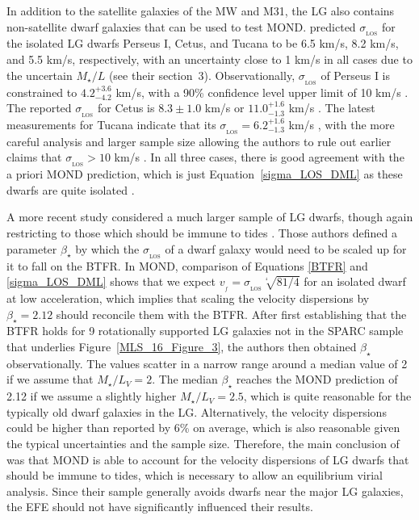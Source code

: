 \documentclass[fleqn,usenatbib,useAMS,onecolumn]{mnras} %
\begin{document}
In addition to the satellite galaxies of the MW and M31, the LG also contains non-satellite dwarf galaxies that can be used to test MOND. \citet{Pawlowski_McGaugh_2014} predicted $\sigma_{_\text{LOS}}$ for the isolated LG dwarfs Perseus I, Cetus, and Tucana to be 6.5 km/s, 8.2 km/s, and 5.5 km/s, respectively, with an uncertainty close to 1 km/s in all cases due to the uncertain $M_{\star}/L$ (see their section~3). Observationally, $\sigma_{_\text{LOS}}$ of Perseus I is constrained to $4.2^{+3.6}_{-4.2}$ km/s, with a 90\% confidence level upper limit of 10 km/s \citep{Martin_2014}. The reported $\sigma_{_\text{LOS}}$ for Cetus is $8.3 \pm 1.0$ km/s \citep{Kirby_2014} or $11.0^{+1.6}_{-1.3}$ km/s \citep{Taibi_2018}. The latest measurements for Tucana indicate that its $\sigma_{_\text{LOS}} = 6.2^{+1.6}_{-1.3}$ km/s \citep{Taibi_2020}, with the more careful analysis and larger sample size allowing the authors to rule out earlier claims that $\sigma_{_\text{LOS}} > 10$ km/s \citep{Fraternali_2009, Guo_2019}. In all three cases, there is good agreement with the a priori MOND prediction, which is just Equation~\ref{sigma_LOS_DML} as these dwarfs are quite isolated \citep{Pawlowski_McGaugh_2014}.

A more recent study considered a much larger sample of LG dwarfs, though again restricting to those which should be immune to tides \citep{McGaugh_2021}. Those authors defined a parameter $\beta_{\star}$ by which the $\sigma_{_\text{LOS}}$ of a dwarf galaxy would need to be scaled up for it to fall on the BTFR. In MOND, comparison of Equations \ref{BTFR} and \ref{sigma_LOS_DML} shows that we expect $v_{_f} = \sigma_{_\text{LOS}} \sqrt[^4]{81/4}$ for an isolated dwarf at low acceleration, which implies that scaling the velocity dispersions by $\beta_{\star} = 2.12$ should reconcile them with the BTFR. After first establishing that the BTFR holds for 9 rotationally supported LG galaxies not in the SPARC sample that underlies Figure~\ref{MLS_16_Figure_3}, the authors then obtained $\beta_{\star}$ observationally. The values scatter in a narrow range around a median value of 2 if we assume that $M_{\star}/L_V = 2$. The median $\beta_{\star}$ reaches the MOND prediction of 2.12 if we assume a slightly higher $M_{\star}/L_V = 2.5$, which is quite reasonable for the typically old dwarf galaxies in the LG. Alternatively, the velocity dispersions could be higher than reported by 6\% on average, which is also reasonable given the typical uncertainties and the sample size. Therefore, the main conclusion of \citet{McGaugh_2021} was that MOND is able to account for the velocity dispersions of LG dwarfs that should be immune to tides, which is necessary to allow an equilibrium virial analysis. Since their sample generally avoids dwarfs near the major LG galaxies, the EFE should not have significantly influenced their results.
\end{document}
